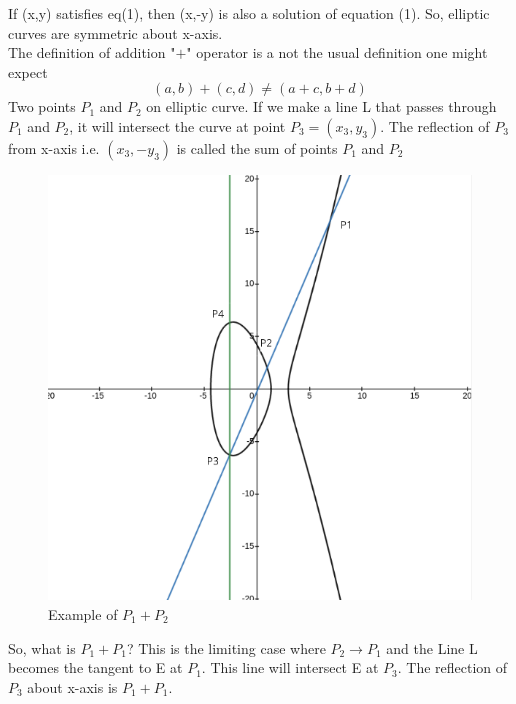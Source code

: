 \documentclass[12pt,a4paper]{report}
\begin{document}
If (x,y) satisfies eq(1), then (x,-y) is also a solution of equation (1). So, elliptic curves are symmetric about x-axis. \\
The definition of addition "$+$" operator is a not the usual definition one might expect
$$(a,b)+(c,d) \neq (a+c,b+d)$$
Two points $P_1$ and $P_2$ on elliptic curve. If we make a line L that passes through $P_1$ and $P_2$, it will intersect the curve at point $P_3=(x_3,y_3)$. The reflection of $P_3$ from x-axis i.e. $(x_3,-y_3)$ is called the sum of points $P_1$ and $P_2$
\begin{figure}[h!]
	\begin{center}
		\caption{Example of $P_1+P_2$}
		\includegraphics[scale=0.4]{2}
	\end{center}
\end{figure}
\cleardoublepage
So, what is $P_1+P_1$? This is the limiting case where $P_2 \to P_1$ and the Line L becomes the tangent to E at $P_1$. This line will intersect E at $P_3$. The reflection of $P_3$ about x-axis  is $P_1+P_1$.
\end{document}
